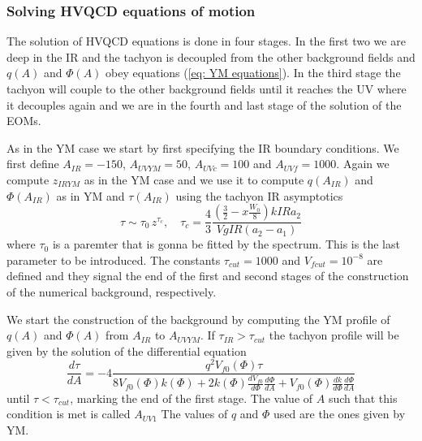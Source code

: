 \documentclass[a4paper,12pt]{article}
\begin{document}
\subsubsection*{Solving HVQCD equations of motion}

The solution of HVQCD equations is done in four stages. In the first two we are deep in the IR and the tachyon is decoupled from the other background fields and $q\left(A\right)$ and $\Phi\left(A\right)$ obey equations (\ref{eq: YM equations}). In the third stage the tachyon will couple to the other background fields until it reaches the UV where it decouples again and we are in the fourth and last stage of the solution of the EOMs.

As in the YM case we start by first specifying the IR boundary conditions. We first define $A_{IR} = -150$, $A_{UVYM} = 50$, $A_{UVc} = 100$ and $A_{UVf} = 1000$.
Again  we compute $z_{IRYM}$ as in the YM case and we use it to compute $q\left(A_{IR}\right)$ and $\Phi\left(A_{IR}\right)$ as in YM and $\tau\left(A_{IR}\right)$ using the tachyon IR asymptotics
\begin{equation}
\tau \sim \tau_0 \, z^{\tau_c}, \quad \tau_c = \frac{4}{3} \frac{\left(\frac{3}{2} - x \frac{W_0}{8}\right) kIR a_2}{VgIR (a_2 - a_1)}
\end{equation}
where $\tau_0$ is a paremter that is gonna be fitted by the spectrum. This is the last parameter to be introduced.
The constants $\tau_{cut} = 1000$ and $V_{f cut} = 10^{-8}$ are defined and they signal the end of the first and second stages of the construction of the numerical background, respectively.

We start the construction of the background by computing the YM profile of $q\left(A\right)$ and $\Phi\left(A\right)$ from $A_{IR}$ to $A_{UVYM}$. If $\tau_{IR} > \tau_{cut}$ the tachyon profile will be given by the solution of the differential equation
\begin{equation}
	\frac{d\tau}{dA} = - 4 \frac{q^2 V_{f0}\left(\Phi\right) \tau}{8 V_{f0}\left( \Phi\right) k\left(\Phi\right) + 2 k\left(\Phi\right) \frac{d V_{f0}}{d\Phi} \frac{d\Phi}{dA} + V_{f0} \left(\Phi\right) \frac{dk}{d\Phi} \frac{d\Phi}{dA} }
\end{equation}
until $\tau < \tau_{cut}$, marking the end of the first stage. The value of $A$ such that this condition is met is called $A_{UV1}$ The values of $q$ and $\Phi$ used are the ones given by YM.
\end{document}
